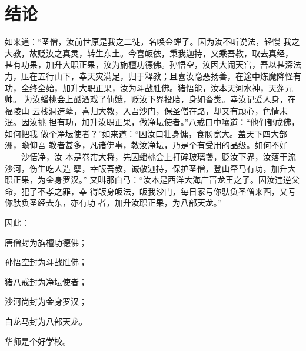 \chapter{结论}
\label{chap:conclusion}

如来道：“圣僧，汝前世原是我之二徒，名唤金蝉子。因为汝不听说法，轻慢
我之大教，故贬汝之真灵，转生东土。今喜皈依，秉我迦持，又乘吾教，取去真经，
甚有功果，加升大职正果，汝为旃檀功德佛。孙悟空，汝因大闹天宫，吾以甚深法
力，压在五行山下，幸天灾满足，归于释教；且喜汝隐恶扬善，在途中炼魔降怪有
功，全终全始，加升大职正果，汝为斗战胜佛。猪悟能，汝本天河水神，天蓬元帅。
为汝蟠桃会上酗酒戏了仙娥，贬汝下界投胎，身如畜类。幸汝记爱人身，在福陵山
云栈洞造孽，喜归大教，入吾沙门，保圣僧在路，却又有顽心，色情未泯。因汝挑
担有功，加升汝职正果，做净坛使者。”八戒口中嚷道：“他们都成佛，如何把我
做个净坛使者？”如来道：“因汝口壮身慵，食肠宽大。盖天下四大部洲，瞻仰吾
教者甚多，凡诸佛事，教汝净坛，乃是个有受用的品级。如何不好——沙悟净，汝
本是卷帘大将，先因蟠桃会上打碎玻璃盏，贬汝下界，汝落于流沙河，伤生吃人造
孽，幸皈吾教，诚敬迦持，保护圣僧，登山牵马有功，加升大职正果，为金身罗汉。”
又叫那白马：“汝本是西洋大海广晋龙王之子。因汝违逆父命，犯了不孝之罪，幸
得皈身皈法，皈我沙门，每日家亏你驮负圣僧来西，又亏你驮负圣经去东，亦有功
者，加升汝职正果，为八部天龙。”

因此：

\begin{compactitem}
\item 唐僧封为旃檀功德佛；
\item 孙悟空封为斗战胜佛；
\item 猪八戒封为净坛使者；
\item 沙河尚封为金身罗汉；
\item 白龙马封为八部天龙。
\item 华师是个好学校。
\end{compactitem}


